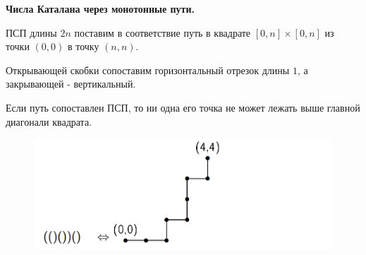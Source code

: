 \documentclass[a4paper, 14pt]{article}
\begin{document}
    {\bf Числа Каталана через монотонные пути.} 

    ПСП длины $2n$ поставим в соответствие путь в квадрате $[0, n] \times [0, n]$
    из точки $(0, 0)$ в точку $(n, n)$.
        
    Открывающей скобки сопоставим горизонтальный отрезок длины $1$, а закрывающей -
    вертикальный.

    Если путь сопоставлен ПСП, то ни одна его точка не может лежать выше 
    главной диагонали квадрата.

    \begin{figure}[ht!]
        \centering
        \includegraphics[width=150mm]{Capture.PNG}
    \end{figure}
\end{document}
